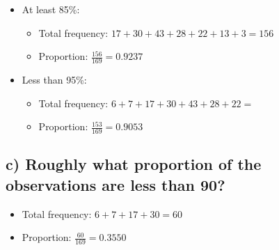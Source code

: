 \begin{itemize}
    \item{At least 85\%:}
    \begin{itemize}
        \item Total frequency: \(17+30+43+28+22+13+3=156\)
        \item Proportion: \(\frac{156}{169}=0.9237\)
    \end{itemize}

    \item{Less than 95\%:}
    \begin{itemize}
        \item Total frequency: \(6+7+17+30+43+28+22=\)
        \item Proportion: \(\frac{153}{169}=0.9053\)
    \end{itemize}
\end{itemize}

\subsection{c) Roughly what proportion of the observations are less 
than 90?}
\begin{itemize}
    \item Total frequency: \(6+7+17+30=60\)
    \item Proportion: \(\frac{60}{169}=0.3550\)
\end{itemize}